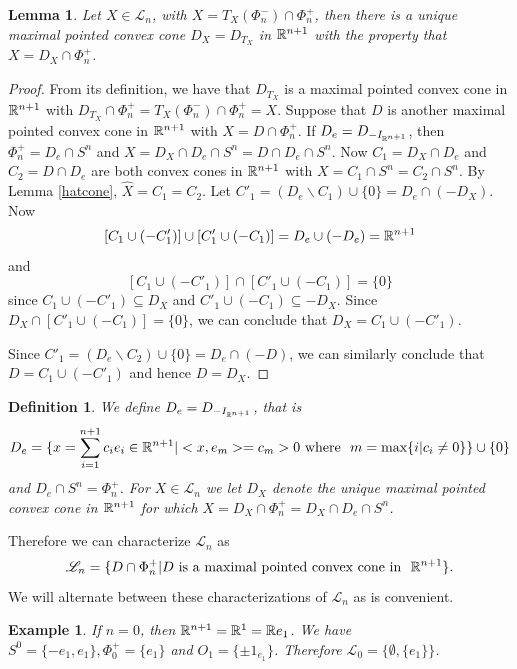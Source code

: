 \documentclass[psamsfonts]{amsart}
\numberwithin{equation}{subsection}
\theoremstyle{plain}
\newtheorem{lemma}[theorem]{Lemma}
\newtheorem{definition}[theorem]{Definition}
\newtheorem{example}[theorem]{Example}
\theoremstyle{definition}
\theoremstyle{remark}
\begin{document}
\begin{lemma} \label{mpcc} Let $X \in \mathcal{L}_n$, with $X = T_X(\Phi_n^-) \cap \Phi_n^+$, then there is a unique maximal 
pointed convex   cone 
$D_X = D_{T_X}$ in $\Bbb{R}^{n + 1}$ with the property that $X = D_X \cap \Phi_n^+$.
\end{lemma}
\begin{proof} From its definition, we have that $D_{T_X}$ is a maximal pointed convex cone in $\Bbb{R}^{n + 1}$ with  $D_{T_X} \cap \Phi_n^+ =  T_X(\Phi_n^-)\cap \Phi_n^+  = X$. Suppose that $D$ is another maximal pointed convex cone in 
$\Bbb{R}^{n + 1}$ with $X = D \cap \Phi_n^+$. If  $D_e = D_{-I_{\Bbb{R}^{n + 1}}}$, then $\Phi_n^+ = D_e \cap S^n$ and 
$X = D_X \cap D_e \cap S^n = D \cap D_e \cap S^n$. Now $C_1 = D_X \cap D_e$ and $C_2 = D \cap D_e$  are both convex  cones in $\Bbb{R}^{n + 1}$ with $X = C_1 \cap S^n = C_2 \cap S^n$. By Lemma \ref{hatcone}, $\hat{X} = C_1 = C_2$. Let $C'_1 = (D_e \backslash C_1) \cup \{0\} = D_e \cap  (-D_X)$.
 Now  
 $$[C_1 \cup (-C'_1) ]
\cup [C'_1 \cup (-C_1)] = D_e \cup (-D_e) =  \Bbb{R}^{n + 1}$$ and
 $$[C_1 \cup (-C'_1) ]
\cap [C'_1 \cup (-C_1)] = \{0\}$$
since $C_1 \cup (-C'_1)  \subseteq D_X$ and $C'_1 \cup (-C_1) \subseteq -D_X$. Since $D_X \cap [C'_1 \cup (-C_1)] = \{0\}$, we can conclude that $D_X = C_1 \cup (-C'_1)$.

 Since $C'_1 = (D_e \backslash C_2) \cup \{0\} = D_e \cap  (-D)$, we can similarly conclude that $D = C_1 \cup (-C'_1)$ and hence $D = D_X$. 

\end{proof}

\begin{definition} \label{mpccX} We define    $D_e = D_{-I_{\Bbb{R}^{n + 1}}}$, that is 
$$D_e =  \{ x = \sum_{i = 1}^{n + 1}c_ie_i \in \Bbb{R}^{n + 1} | <x, e_m> = c_m > 0 \ \mbox{where } \  m = \mbox{max}\{i | c_i \not= 0\}\} \cup \{0\}$$
and $D_e \cap S^n = \Phi_n^+$. 
For  $X \in \mathcal{L}_n$ we let $D_X$ denote the unique maximal pointed convex cone in $\Bbb{R}^{n + 1}$ for which $X = D_X \cap \Phi_n^+ = D_X \cap D_e \cap S^n$. 
\end{definition}

 Therefore we can characterize $\mathcal{L}_n$ as
$$\mathcal{L}_n = \{D\cap \Phi_n^+ | D \ \mbox{is a maximal pointed convex cone in } \ \Bbb{R}^{n + 1}\}.$$
We will alternate between these characterizations of $\mathcal{L}_n$ as is convenient. 

\begin{example}
 If $n = 0$, then $\Bbb{R}^{n + 1} = \Bbb{R}^1 = \Bbb{R}e_1$. We have $S^0 = \{-e_1, e_1\}, \Phi_0^+ = \{e_1\}$ and $O_1 
= \{\pm 1_{e_1}\}$.  Therefore $\mathcal{L}_0 = \{\emptyset, \{e_1\}\}$. 
\end{example}
\end{document}
